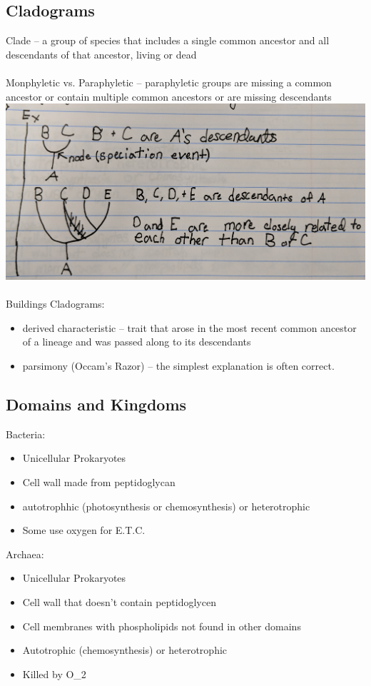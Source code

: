 \documentclass{article}
\begin{document}
\subsection{Cladograms}
Clade -- a group of species that includes a single common ancestor and all descendants of that ancestor, living or dead\\
\\
Monphyletic vs. Paraphyletic -- paraphyletic groups are missing a common ancestor or contain multiple common ancestors or are missing descendants
\\
\includegraphics[scale=0.1]{cladogram}\\
\\
Buildings Cladograms:
\begin{itemize}
\item derived characteristic -- trait that arose in the most recent common ancestor of a lineage and was passed along to its descendants
\item parsimony (Occam's Razor) -- the simplest explanation is often correct.
\end{itemize}

\subsection{Domains and Kingdoms}

Bacteria:
\begin{itemize}
\item Unicellular Prokaryotes
\item Cell wall made from peptidoglycan
\item autotrophhic (photosynthesis or chemosynthesis) or heterotrophic
\item Some use oxygen for E.T.C.
\end{itemize}

Archaea:
\begin{itemize}
\item Unicellular Prokaryotes
\item Cell wall that doesn't contain peptidoglycen
\item Cell membranes with phospholipids not found in other domains
\item Autotrophic (chemosynthesis) or heterotrophic
\item Killed by O_2
\end{itemize}
\end{document}
